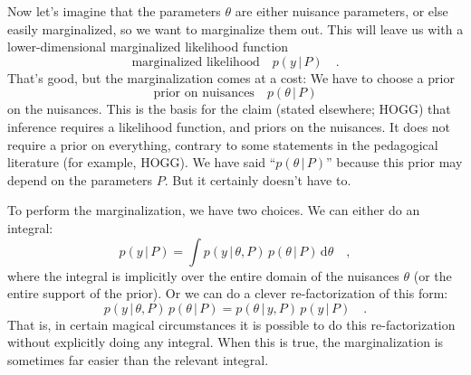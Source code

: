 \documentclass[12pt, letterpaper]{article}
\newcommand{\given}{\,|\,}
\newcommand{\dd}{\mathrm{d}}
\begin{document}
Now let's imagine that the parameters $\theta$ are either nuisance
parameters, or else easily marginalized, so we want to marginalize
them out.
This will leave us with a lower-dimensional marginalized likelihood
function
\begin{equation}
\mbox{marginalized likelihood} \quad p(y\given P)
\quad .
\end{equation}
That's good, but the marginalization comes at a cost:
We have to choose a prior
\begin{equation}
\mbox{prior on nuisances} \quad p(\theta\given P)
\end{equation}
on the nuisances.
This is the basis for the claim (stated elsewhere; HOGG) that
inference requires a likelihood function, and priors on the nuisances.
It does not require a prior on everything, contrary to some statements
in the pedagogical literature (for example, HOGG).
We have said ``$p(\theta\given P)$'' because this prior may depend on
the parameters $P$. But it certainly doesn't have to.

To perform the marginalization, we have two choices.
We can either do an integral:
\begin{equation}
p(y\given P) = \int p(y\given\theta, P)\,p(\theta\given P)\,\dd\theta
\quad ,
\end{equation}
where the integral is implicitly over the entire domain of the
nuisances $\theta$ (or the entire support of the prior).
Or we can do a clever re-factorization of this form:
\begin{equation}
p(y\given\theta,P)\,p(\theta\given P)
 = p(\theta\given y,P)\,p(y\given P)
\quad .
\end{equation}
That is, in certain magical circumstances it is possible to do this
re-factorization without explicitly doing any integral.
When this is true, the marginalization is sometimes far easier than
the relevant integral.
\end{document}
